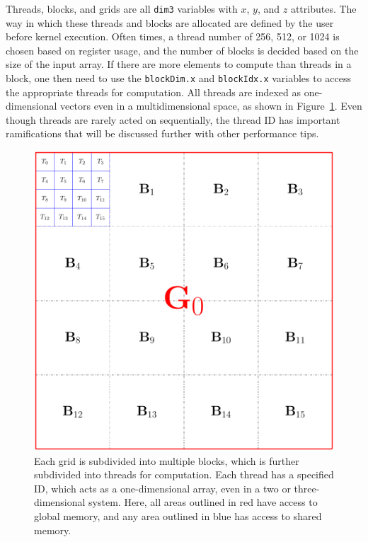 Threads, blocks, and grids are all \texttt{dim3} variables with $x$, $y$, and $z$ attributes.
The way in which these threads and blocks are allocated are defined by the user before kernel execution.
Often times, a thread number of 256, 512, or 1024 is chosen based on register usage, and the number of blocks is decided based on the size of the input array.
If there are more elements to compute than threads in a block, one then need to use the \texttt{blockDim.x} and \texttt{blockIdx.x} variables to access the appropriate threads for computation.
All threads are indexed as one-dimensional vectors even in a multidimensional space, as shown in Figure~\ref{fig:threadsnblocks}.
Even though threads are rarely acted on sequentially, the thread ID has important ramifications that will be discussed further with other performance tips.

\begin{figure}
\includegraphics[width=\textwidth]{data/gpu/gputhreads.pdf}
\caption{Each grid is subdivided into multiple blocks, which is further subdivided into threads for computation. Each thread has a specified ID, which acts as a one-dimensional array, even in a two or three-dimensional system. Here, all areas outlined in red have access to global memory, and any area outlined in blue has access to shared memory. }
\label{fig:threadsnblocks}
\end{figure}

